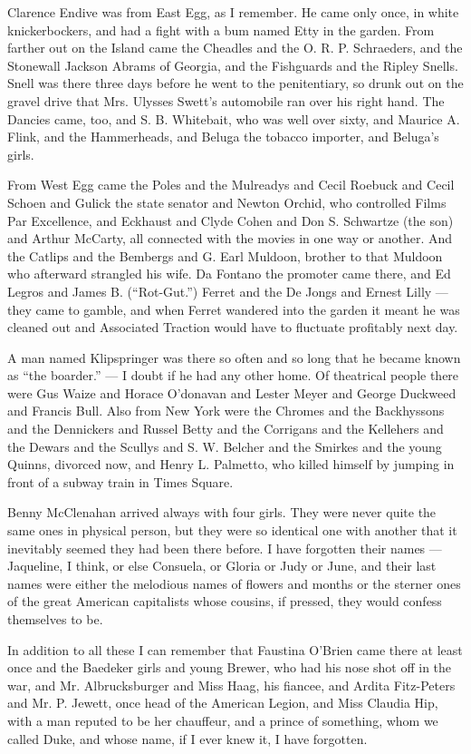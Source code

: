 \documentclass{znotebook}
\begin{document}
Clarence Endive was from East Egg, as I remember. He came only once, in white knickerbockers, and had a fight with a bum named Etty in the garden. From farther out on the Island came the Cheadles and the O. R. P. Schraeders, and the Stonewall Jackson Abrams of Georgia, and the Fishguards and the Ripley Snells. Snell was there three days before he went to the penitentiary, so drunk out on the gravel drive that Mrs. Ulysses Swett's automobile ran over his right hand. The Dancies came, too, and S. B. Whitebait, who was well over sixty, and Maurice A. Flink, and the Hammerheads, and Beluga the tobacco importer, and Beluga's girls.

From West Egg came the Poles and the Mulreadys and Cecil Roebuck and Cecil Schoen and Gulick the state senator and Newton Orchid, who controlled Films Par Excellence, and Eckhaust and Clyde Cohen and Don S. Schwartze (the son) and Arthur McCarty, all connected with the movies in one way or another. And the Catlips and the Bembergs and G. Earl Muldoon, brother to that Muldoon who afterward strangled his wife. Da Fontano the promoter came there, and Ed Legros and James B. (``Rot-Gut.'') Ferret and the De Jongs and Ernest Lilly ---{} they came to gamble, and when Ferret wandered into the garden it meant he was cleaned out and Associated Traction would have to fluctuate profitably next day.

A man named Klipspringer was there so often and so long that he became known as ``the boarder.'' ---{} I doubt if he had any other home. Of theatrical people there were Gus Waize and Horace O'donavan and Lester Meyer and George Duckweed and Francis Bull. Also from New York were the Chromes and the Backhyssons and the Dennickers and Russel Betty and the Corrigans and the Kellehers and the Dewars and the Scullys and S. W. Belcher and the Smirkes and the young Quinns, divorced now, and Henry L. Palmetto, who killed himself by jumping in front of a subway train in Times Square.

Benny McClenahan arrived always with four girls. They were never quite the same ones in physical person, but they were so identical one with another that it inevitably seemed they had been there before. I have forgotten their names ---{} Jaqueline, I think, or else Consuela, or Gloria or Judy or June, and their last names were either the melodious names of flowers and months or the sterner ones of the great American capitalists whose cousins, if pressed, they would confess themselves to be.

In addition to all these I can remember that Faustina O'Brien came there at least once and the Baedeker girls and young Brewer, who had his nose shot off in the war, and Mr. Albrucksburger and Miss Haag, his fiancee, and Ardita Fitz-Peters and Mr. P. Jewett, once head of the American Legion, and Miss Claudia Hip, with a man reputed to be her chauffeur, and a prince of something, whom we called Duke, and whose name, if I ever knew it, I have forgotten.
\end{document}

